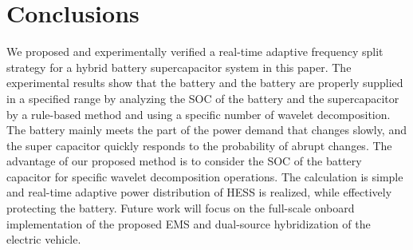 \documentclass[energies,article,submit,moreauthors,pdftex,10pt,a4paper]{Definitions/mdpi}
\begin{document}

\section{Conclusions}
We proposed and experimentally verified a real-time adaptive frequency split strategy for a hybrid battery supercapacitor system in this paper. The experimental results show that the battery and the battery are properly supplied in a specified range by analyzing the SOC of the battery and the supercapacitor by a rule-based method and using a specific number of wavelet decomposition. The battery mainly meets the part of the power demand that changes slowly, and the super capacitor quickly responds to the probability of abrupt changes. The advantage of our proposed method is to consider the SOC of the battery capacitor for specific wavelet decomposition operations. The calculation is simple and real-time adaptive power distribution of HESS is realized, while effectively protecting the battery. Future work will focus on the full-scale onboard implementation of the proposed EMS and dual-source hybridization of the electric vehicle.

\vspace{6pt} 



\end{document}
